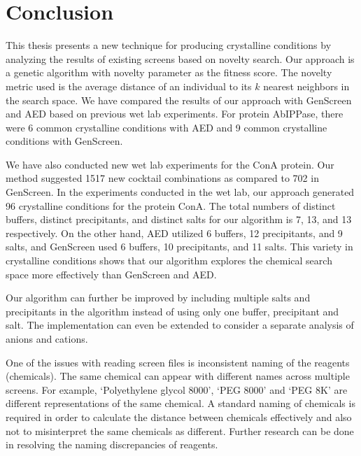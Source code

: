 \chapter{Conclusion}
\label{ch:conclusion}

This thesis presents a new technique for producing crystalline conditions by analyzing the results of existing screens based on novelty search. Our approach is a genetic algorithm with novelty parameter as the fitness score. The novelty metric used is the average distance of an individual to its $k$ nearest neighbors in the search space. We have compared the results of our approach with GenScreen and AED based on previous wet lab experiments. 
For protein AbIPPase, there were 6 common crystalline conditions with AED and 9 common crystalline conditions with GenScreen. 

We have also conducted new wet lab experiments for the ConA protein. Our method suggested 1517 new cocktail combinations as compared to 702 in GenScreen.
In the experiments conducted in the wet lab, our approach generated 96 crystalline conditions for the protein ConA. The total numbers of distinct buffers, distinct precipitants, and distinct salts for our algorithm is 7, 13, and 13 respectively. On the other hand, AED utilized 6 buffers, 12 precipitants, and 9 salts, and GenScreen used 6 buffers, 10 precipitants, and 11 salts. This variety in crystalline conditions shows that our algorithm explores the chemical search space more effectively than GenScreen and AED.

Our algorithm can further be improved by including multiple salts and precipitants in the algorithm instead of using only one buffer, precipitant and salt. The implementation can even be extended to consider a separate analysis of anions and cations.

One of the issues with reading screen files is inconsistent naming of the reagents (chemicals). The same chemical can appear with different names across multiple screens. For example, `Polyethylene glycol 8000', `PEG 8000' and `PEG 8K' are different representations of the same chemical. A standard naming of chemicals is required in order to calculate the distance between chemicals effectively and also not  to misinterpret the same chemicals as different. Further research can be done in resolving the naming discrepancies of reagents.

